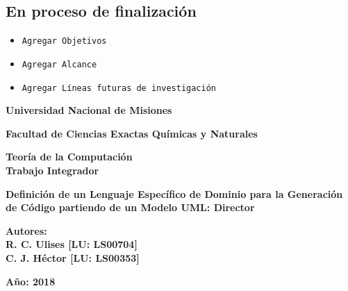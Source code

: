 \documentclass{report}
\begin{document}
\subsection*{En proceso de finalización}
\begin{itemize}
  \item \texttt{Agregar Objetivos}
  \item \texttt{Agregar Alcance}
  \item \texttt{Agregar Líneas futuras de investigación}
\end{itemize}

\newpage
\begin{titlepage}
	\fontsize{14pt}{14pt} \selectfont
	\begin{center}{\bfseries Universidad Nacional de Misiones}\end{center}
	\vspace*{1\baselineskip}
	\begin{center}{\bfseries Facultad de Ciencias Exactas Químicas y
	Naturales}\end{center}
	\vspace*{2\baselineskip}
	\fontsize{16pt}{16pt} \selectfont
	\begin{center}{\bfseries {Teoría de la Computación\\Trabajo Integrador}}\end{center}
	\vspace*{2\baselineskip}
	\fontsize{18pt}{18pt} \selectfont
	\begin{center}{\bfseries Definición de un Lenguaje Específico de Dominio
	para la Generación de Código partiendo de un Modelo UML: Director}\end{center}
	\vspace*{2\baselineskip}
	\fontsize{16pt}{16pt} \selectfont
	\begin{center}{\bfseries Autores:\\R. C. Ulises [LU: LS00704]\\C. J. Héctor [LU: LS00353]}\end{center}
	\vspace*{\baselineskip}
	\fontsize{16pt}{16pt} \selectfont
	\begin{center}{}\end{center}
	\vspace*{2\baselineskip}
	\fontsize{16pt}{16pt} \selectfont
	\begin{center}{\bfseries Año: 2018}\end{center}
\end{titlepage}
\end{document}
